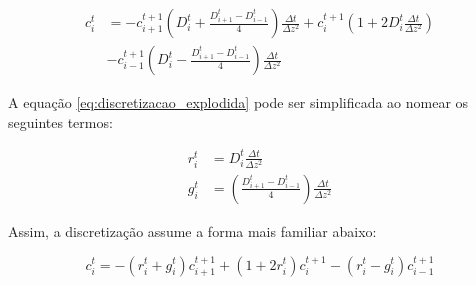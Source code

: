 \begin{align}
  c^t_i &= -c^{t+1}_{i+1}\left(D^{t}_i + \frac{D^{t}_{i+1} - D^{t}_{i-1}}{4}\right)\frac{\Delta t}{\Delta z^2} + c^{t+1}_{i} \left(1 + 2 D_i^{t}\frac{\Delta t}{\Delta z^2}\right) \nonumber\\
  &- c^{t+1}_{i-1}\left(D^{t}_i - \frac{D^{t}_{i+1} - D^{t}_{i-1}}{4}\right)\frac{\Delta t}{\Delta z^2}
  \label{eq:discretizacao_explodida}
\end{align}

A equação \ref{eq:discretizacao_explodida} pode ser simplificada ao nomear os seguintes termos:

\begin{align}
  r^{t}_{i} &= D^{t}_{i}\frac{\Delta t}{\Delta z^2}\\
  g^{t}_{i} &= \left(\frac{D^{t}_{i+1} - D^{t}_{i-1}}{4}\right)\frac{\Delta t}{\Delta z^2}
\end{align}

Assim, a discretização assume a forma mais familiar abaixo:

\begin{equation}
  c^t_i = -\left(r^{t}_{i} + g^{t}_{i}\right) c^{t+1}_{i+1} + \left(1 + 2 r^{t}_{i}\right) c^{t+1}_{i} - \left(r^{t}_{i} - g^{t}_{i}\right) c^{t+1}_{i-1}
\end{equation}
